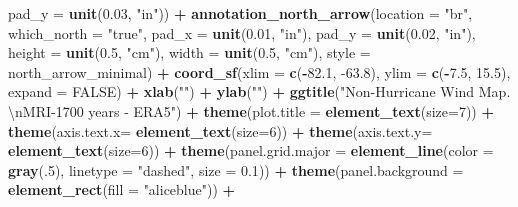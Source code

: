 \documentclass[12pt,oneside]{reedthesis}
\newenvironment{Shaded}{\begin{snugshade}}{\end{snugshade}}
\newcommand{\CharTok}[1]{\textcolor[rgb]{0.31,0.60,0.02}{#1}}
\newcommand{\DataTypeTok}[1]{\textcolor[rgb]{0.13,0.29,0.53}{#1}}
\newcommand{\DecValTok}[1]{\textcolor[rgb]{0.00,0.00,0.81}{#1}}
\newcommand{\FloatTok}[1]{\textcolor[rgb]{0.00,0.00,0.81}{#1}}
\newcommand{\KeywordTok}[1]{\textcolor[rgb]{0.13,0.29,0.53}{\textbf{#1}}}
\newcommand{\NormalTok}[1]{#1}
\newcommand{\OperatorTok}[1]{\textcolor[rgb]{0.81,0.36,0.00}{\textbf{#1}}}
\newcommand{\OtherTok}[1]{\textcolor[rgb]{0.56,0.35,0.01}{#1}}
\newcommand{\StringTok}[1]{\textcolor[rgb]{0.31,0.60,0.02}{#1}}
\begin{document}
\begin{Shaded}
\begin{Highlighting}[]
   \DataTypeTok{pad_y =} \KeywordTok{unit}\NormalTok{(}\FloatTok{0.03}\NormalTok{, }\StringTok{"in"}\NormalTok{)) }\OperatorTok{+}\StringTok{ }
\StringTok{  }\KeywordTok{annotation_north_arrow}\NormalTok{(}\DataTypeTok{location =} \StringTok{"br"}\NormalTok{, }\DataTypeTok{which_north =} \StringTok{"true"}\NormalTok{, }\DataTypeTok{pad_x =} \KeywordTok{unit}\NormalTok{(}\FloatTok{0.01}\NormalTok{, }\StringTok{"in"}\NormalTok{), }\DataTypeTok{pad_y =} \KeywordTok{unit}\NormalTok{(}\FloatTok{0.02}\NormalTok{, }\StringTok{"in"}\NormalTok{), }\DataTypeTok{height =} \KeywordTok{unit}\NormalTok{(}\FloatTok{0.5}\NormalTok{, }\StringTok{"cm"}\NormalTok{), }
   \DataTypeTok{width =} \KeywordTok{unit}\NormalTok{(}\FloatTok{0.5}\NormalTok{, }\StringTok{"cm"}\NormalTok{), }\DataTypeTok{style =}\NormalTok{ north_arrow_minimal) }\OperatorTok{+}
\StringTok{  }\KeywordTok{coord_sf}\NormalTok{(}\DataTypeTok{xlim =} \KeywordTok{c}\NormalTok{(}\OperatorTok{-}\FloatTok{82.1}\NormalTok{, }\FloatTok{-63.8}\NormalTok{), }\DataTypeTok{ylim =} \KeywordTok{c}\NormalTok{(}\OperatorTok{-}\FloatTok{7.5}\NormalTok{, }\FloatTok{15.5}\NormalTok{), }\DataTypeTok{expand =} \OtherTok{FALSE}\NormalTok{) }\OperatorTok{+}
\StringTok{  }\KeywordTok{xlab}\NormalTok{(}\StringTok{""}\NormalTok{) }\OperatorTok{+}\StringTok{ }
\StringTok{  }\KeywordTok{ylab}\NormalTok{(}\StringTok{""}\NormalTok{) }\OperatorTok{+}\StringTok{ }
\StringTok{  }\KeywordTok{ggtitle}\NormalTok{(}\StringTok{"Non-Hurricane Wind Map. }\CharTok{\textbackslash{}n}\StringTok{MRI-1700 years - ERA5"}\NormalTok{) }\OperatorTok{+}\StringTok{ }
\StringTok{  }\KeywordTok{theme}\NormalTok{(}\DataTypeTok{plot.title =} \KeywordTok{element_text}\NormalTok{(}\DataTypeTok{size=}\DecValTok{7}\NormalTok{)) }\OperatorTok{+}
\StringTok{  }\KeywordTok{theme}\NormalTok{(}\DataTypeTok{axis.text.x=} \KeywordTok{element_text}\NormalTok{(}\DataTypeTok{size=}\DecValTok{6}\NormalTok{)) }\OperatorTok{+}\StringTok{ }
\StringTok{  }\KeywordTok{theme}\NormalTok{(}\DataTypeTok{axis.text.y=} \KeywordTok{element_text}\NormalTok{(}\DataTypeTok{size=}\DecValTok{6}\NormalTok{)) }\OperatorTok{+}
\StringTok{  }\KeywordTok{theme}\NormalTok{(}\DataTypeTok{panel.grid.major =} \KeywordTok{element_line}\NormalTok{(}\DataTypeTok{color =} \KeywordTok{gray}\NormalTok{(.}\DecValTok{5}\NormalTok{), }\DataTypeTok{linetype =} \StringTok{"dashed"}\NormalTok{, }\DataTypeTok{size =} \FloatTok{0.1}\NormalTok{)) }\OperatorTok{+}
\StringTok{  }\KeywordTok{theme}\NormalTok{(}\DataTypeTok{panel.background =} \KeywordTok{element_rect}\NormalTok{(}\DataTypeTok{fill =} \StringTok{"aliceblue"}\NormalTok{)) }\OperatorTok{+}

\end{Highlighting}
\end{Shaded}
\end{document}
